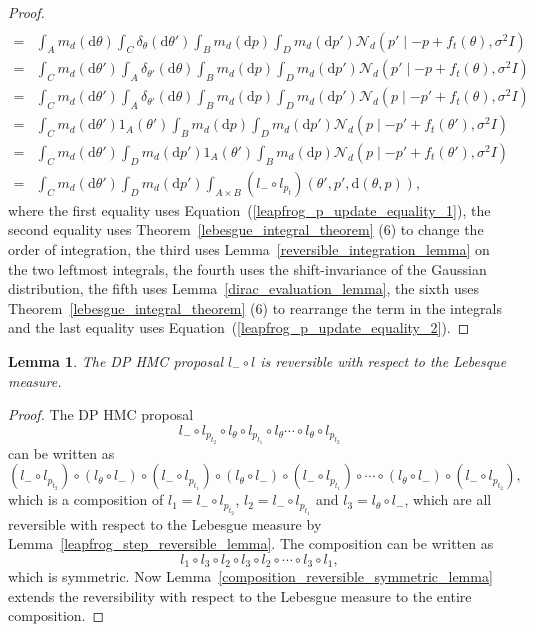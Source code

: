 \documentclass[english,twoside,openright]{HYgraduMLDS}
\newtheorem{lemma}{Lemma}[chapter]
\newcommand{\dx}{\mathrm{d}}
\newcommand{\caln}{{\mathcal{N}}}
\begin{document}
\begin{proof}
\begin{align*}
    \\=& \int_{A}m_{d}(\dx \theta)\int_{C}\delta_{\theta}(\dx \theta')\int_{B}m_{d}(\dx p)
         \int_{D}m_{d}(\dx p') \caln_{d}(p'\mid -p + f_{t}(\theta), \sigma^{2}I)
    \\=& \int_{C}m_{d}(\dx \theta')\int_{A}\delta_{\theta'}(\dx \theta)\int_{B}m_{d}(\dx p)
         \int_{D}m_{d}(\dx p') \caln_{d}(p'\mid -p + f_{t}(\theta), \sigma^{2}I)
    \\=& \int_{C}m_{d}(\dx \theta')\int_{A}\delta_{\theta'}(\dx \theta)\int_{B}m_{d}(\dx p)
         \int_{D}m_{d}(\dx p') \caln_{d}(p\mid -p' + f_{t}(\theta), \sigma^{2}I)
    \\=& \int_{C}m_{d}(\dx \theta')1_{A}(\theta')\int_{B}m_{d}(\dx p)
         \int_{D}m_{d}(\dx p') \caln_{d}(p\mid -p' + f_{t}(\theta'), \sigma^{2}I)
    \\=& \int_{C}m_{d}(\dx \theta')\int_{D}m_{d}(\dx p')1_{A}(\theta')
         \int_{B}m_{d}(\dx p)\caln_{d}(p\mid -p' + f_{t}(\theta'), \sigma^{2}I)
    \\=& \int_{C}m_{d}(\dx\theta')\int_{D}m_{d}(\dx p')
         \int_{A\times B}(l_{-}\circ l_{p_{t}})(\theta', p', \dx(\theta, p)),
  \end{align*}
  where the first equality uses Equation~(\ref{leapfrog_p_update_equality_1}),
  the second equality uses Theorem~\ref{lebesgue_integral_theorem} (6)
  to change the order of integration,
  the third uses Lemma~\ref{reversible_integration_lemma} on the two leftmost
  integrals,
  the fourth uses the shift-invariance of the Gaussian distribution,
  the fifth uses Lemma~\ref{dirac_evaluation_lemma},
  the sixth uses Theorem~\ref{lebesgue_integral_theorem} (6) to rearrange the
  term in the integrals and the last equality uses
  Equation~(\ref{leapfrog_p_update_equality_2}).
\end{proof}

\begin{lemma}\label{leapfrog_reversibility_lemma}
	The DP HMC proposal \(l_{-} \circ l\) is reversible with respect
  to the Lebesque measure.
\end{lemma}
\begin{proof}
  The DP HMC proposal
  \[
    l_{-}\circ l_{p_{t_{2}}}\circ l_{\theta}\circ l_{p_{t_{1}}}\circ l_{\theta}
    \dotsb \circ l_{\theta}\circ l_{p_{t_{2}}}
  \]
  can be written as
  \[
    (l_{-}\circ l_{p_{t_{2}}})\circ (l_{\theta} \circ l_{-})\circ (l_{-}\circ l_{p_{t_{1}}})
    \circ (l_{\theta} \circ l_{-}) \circ (l_{-} \circ l_{p_{t_{1}}})\circ
    \dotsb \circ (l_{\theta}\circ l_{-})\circ (l_{-}\circ l_{p_{t_{2}}}),
  \]
  which is a composition of \(l_{1} = l_{-}\circ l_{p_{t_{2}}}\),
  \(l_{2} = l_{-}\circ l_{p_{t_{1}}}\)
  and \(l_{3} = l_{\theta}\circ l_{-}\), which are all reversible with respect to the
  Lebesgue measure by Lemma~\ref{leapfrog_step_reversible_lemma}.
  The composition can be written as
  \[
    l_{1}\circ l_{3}\circ l_{2}\circ l_{3}\circ l_{2}\circ\dotsb \circ l_{3}\circ l_{1},
  \]
  which is symmetric. Now
  Lemma~\ref{composition_reversible_symmetric_lemma} extends the reversibility
  with respect to the Lebesgue measure to the entire composition.
\end{proof}
\end{document}
